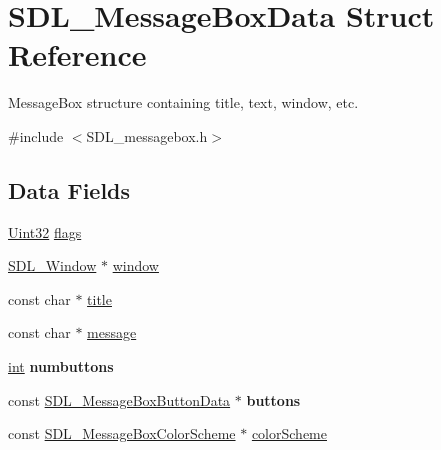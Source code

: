 \hypertarget{struct_s_d_l___message_box_data}{}\section{S\+D\+L\+\_\+\+Message\+Box\+Data Struct Reference}
\label{struct_s_d_l___message_box_data}


Message\+Box structure containing title, text, window, etc.  




{\ttfamily \#include $<$S\+D\+L\+\_\+messagebox.\+h$>$}

\subsection*{Data Fields}
\begin{DoxyCompactItemize}
\item 
\hyperlink{_s_d_l__stdinc_8h_add440eff171ea5f55cb00c4a9ab8672d}{Uint32} \hyperlink{struct_s_d_l___message_box_data_a048097c5cc2146ce1ff2450684f1b51c}{flags}
\item 
\hyperlink{_s_d_l__video_8h_a55a196c7d3b8497538632c79ae1e6392}{S\+D\+L\+\_\+\+Window} $\ast$ \hyperlink{struct_s_d_l___message_box_data_aaa8e409e04dcf575ef63fd5fb3db06f9}{window}
\item 
const char $\ast$ \hyperlink{struct_s_d_l___message_box_data_a8214780964530800368b406c681fd1d9}{title}
\item 
const char $\ast$ \hyperlink{struct_s_d_l___message_box_data_a254bf0858da09c96a48daf64404eb4f8}{message}
\item 
\hyperlink{_s_d_l__thread_8h_a6a64f9be4433e4de6e2f2f548cf3c08e}{int} {\bfseries numbuttons}\hypertarget{struct_s_d_l___message_box_data_adff7d306bb56e132b0060191672c9525}{}\label{struct_s_d_l___message_box_data_adff7d306bb56e132b0060191672c9525}

\item 
const \hyperlink{struct_s_d_l___message_box_button_data}{S\+D\+L\+\_\+\+Message\+Box\+Button\+Data} $\ast$ {\bfseries buttons}\hypertarget{struct_s_d_l___message_box_data_a5d024a90e0db32dee923d8c873118225}{}\label{struct_s_d_l___message_box_data_a5d024a90e0db32dee923d8c873118225}

\item 
const \hyperlink{struct_s_d_l___message_box_color_scheme}{S\+D\+L\+\_\+\+Message\+Box\+Color\+Scheme} $\ast$ \hyperlink{struct_s_d_l___message_box_data_afcad43ea8520ac57b30b35bee0077618}{color\+Scheme}
\end{DoxyCompactItemize}



